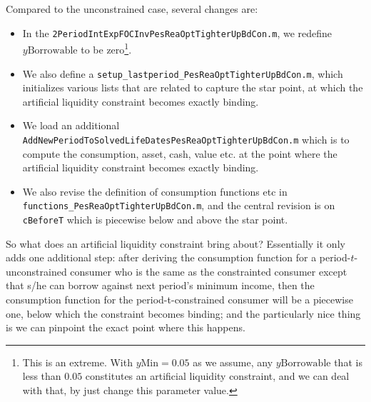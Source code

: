 \documentclass[titlepage,abstract]{\econtex}
\providecommand{\yMin}{y\text{Min}}
\providecommand{\yBorrowable}{y\text{Borrowable}}
\begin{document}
Compared to the unconstrained case, several changes are:
\begin{itemize}
\item In the \texttt{2PeriodIntExpFOCInvPesReaOptTighterUpBdCon.m}, we redefine $\yBorrowable$ to be zero\footnote{This is an extreme. With $\yMin=0.05$ as we assume, any $\yBorrowable$ that is less than $0.05$ constitutes an artificial liquidity constraint, and we can deal with that, by just change this parameter value.}.
\item We also define a \texttt{setup\_lastperiod\_PesReaOptTighterUpBdCon.m}, which initializes various lists that are related to capture the star point, at which the artificial liquidity constraint becomes exactly binding. 
\item We load an additional \texttt{AddNewPeriodToSolvedLifeDatesPesReaOptTighterUpBdCon.m} which is to compute the consumption, asset, cash, value etc. at the point where the artificial liquidity constraint becomes exactly binding.
\item We also revise the definition of consumption functions etc in \texttt{functions\_PesReaOptTighterUpBdCon.m}, and the central revision is on \texttt{cBeforeT} which is piecewise below and above the star point.
\end{itemize}

So what does an artificial liquidity constraint bring about? Essentially it only adds one additional step: after deriving the consumption function for a period-$t$-unconstrained consumer who is the same as the constrainted consumer except that s/he can borrow against next period's minimum income, then the consumption function for the period-t-constrained consumer will be a piecewise one, below which the constraint becomes binding; and the particularly nice thing is we can pinpoint the exact point where this happens.

%
\end{document}
